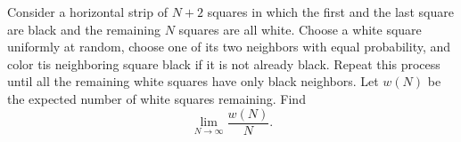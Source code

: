 Consider a horizontal strip of $N+2$ squares in which the first and the last square are black and the remaining $N$ squares are all white. Choose a white square uniformly at random, choose one of its two neighbors with equal probability, and color tis neighboring square black if it is not already black. Repeat this process until all the remaining white squares have only black neighbors. Let $w(N)$ be the expected number of white squares remaining. Find
\[ \lim_{N\to\infty}\frac{w(N)}{N}.\]